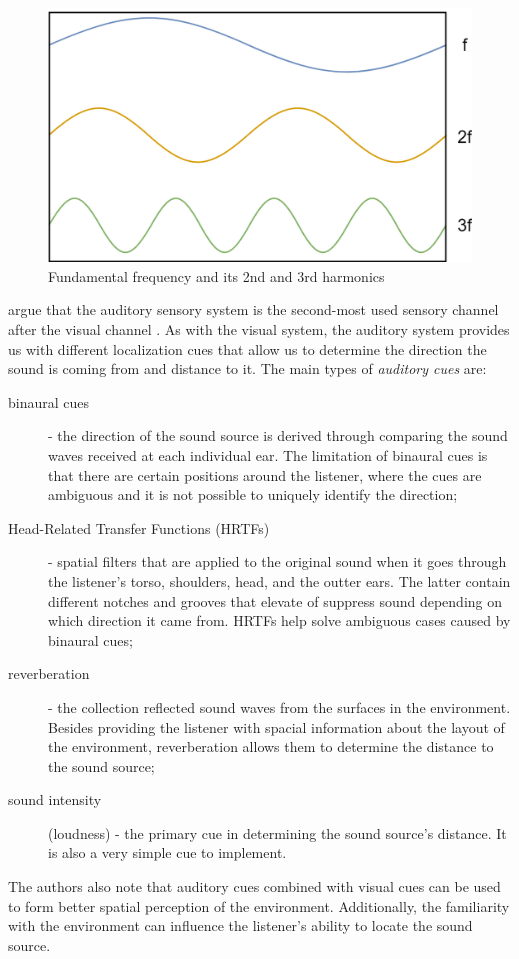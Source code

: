 \begin{figure}
	\centering
	\includegraphics[width=0.7\linewidth]{figures/fundamental_frequency_and_harmonics}
	\caption{Fundamental frequency and its 2nd and 3rd harmonics}
	\label{fig:fundamentalfrequencyandharmonics}
\end{figure}

\parencite[p.~46]{jr_3d_2017} argue that the auditory sensory system is the second-most used sensory channel after the visual channel . As with the visual system, the auditory system provides us with different localization cues that allow us to determine the direction the sound is coming from and distance to it. The main types of \textit{auditory cues }are:
\begin{description}
	\item[binaural cues] - the direction of the sound source is derived through comparing the sound waves received at each individual ear. The limitation of binaural cues is that there are certain positions around the listener, where the cues are ambiguous and it is not possible to uniquely identify the direction;
	\item[Head-Related Transfer Functions (HRTFs)] - spatial filters that are applied to the original sound when it goes through the listener's torso, shoulders, head, and the outter ears. The latter contain different notches and grooves that elevate of suppress sound depending on which direction it came from. HRTFs help solve ambiguous cases caused by binaural cues;
	\item[reverberation] - the collection reflected sound waves from the surfaces in the environment. Besides providing the listener with spacial information about the layout of the environment, reverberation allows them to determine the distance to the sound source;
	\item[sound intensity] (loudness) - the primary cue in determining the sound source's distance. It is also a very simple cue to implement.
\end{description}
The authors also note that auditory cues combined with visual cues can be used to form better spatial perception of the environment. Additionally, the familiarity with the environment can influence the listener's ability to locate the sound source.

